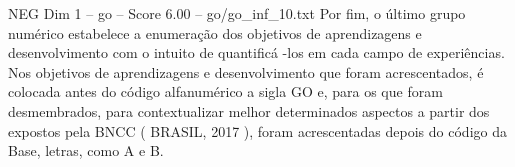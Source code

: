 \begin{textsample}{NEG Dim 1 – go – Score 6.00 – go/go\_inf\_10.txt}
Por fim, o último grupo numérico estabelece a enumeração dos objetivos de aprendizagens e desenvolvimento com o intuito de quantificá -los em cada campo de experiências.
Nos objetivos de aprendizagens e desenvolvimento que foram acrescentados, é colocada antes do código alfanumérico a sigla GO e, para os que foram desmembrados, para contextualizar melhor determinados aspectos a partir dos expostos pela BNCC ( BRASIL, 2017 ), foram acrescentadas depois do código da Base, letras, como A e B.

\end{textsample}
